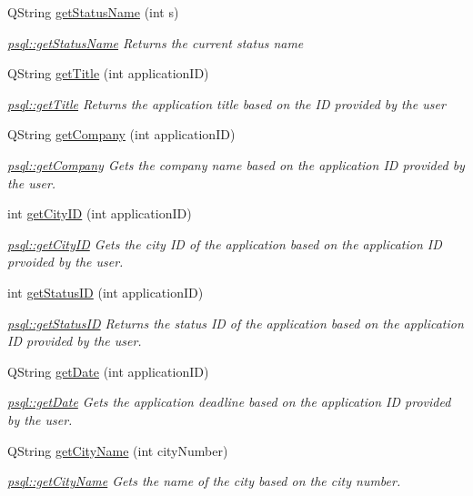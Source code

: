 \begin{DoxyCompactItemize}
Q\+String \hyperlink{classpsql_a5c2a64419a68a258071fd1f9a37c7c09}{get\+Status\+Name} (int s)
\begin{DoxyCompactList}\small\item\em \hyperlink{classpsql_a5c2a64419a68a258071fd1f9a37c7c09}{psql\+::get\+Status\+Name} Returns the current status name \end{DoxyCompactList}\item 
Q\+String \hyperlink{classpsql_ada9e3be3e0866011edf53e30ec510afc}{get\+Title} (int application\+ID)
\begin{DoxyCompactList}\small\item\em \hyperlink{classpsql_ada9e3be3e0866011edf53e30ec510afc}{psql\+::get\+Title} Returns the application title based on the ID provided by the user \end{DoxyCompactList}\item 
Q\+String \hyperlink{classpsql_a09745cd03f09ffb2dacacaab4281915f}{get\+Company} (int application\+ID)
\begin{DoxyCompactList}\small\item\em \hyperlink{classpsql_a09745cd03f09ffb2dacacaab4281915f}{psql\+::get\+Company} Gets the company name based on the application ID provided by the user. \end{DoxyCompactList}\item 
int \hyperlink{classpsql_af3462a12dc106e0ca8df4fa8fcf28436}{get\+City\+ID} (int application\+ID)
\begin{DoxyCompactList}\small\item\em \hyperlink{classpsql_af3462a12dc106e0ca8df4fa8fcf28436}{psql\+::get\+City\+ID} Gets the city ID of the application based on the application ID prvoided by the user. \end{DoxyCompactList}\item 
int \hyperlink{classpsql_a9c02c92c09cb60c35d24375673b7df06}{get\+Status\+ID} (int application\+ID)
\begin{DoxyCompactList}\small\item\em \hyperlink{classpsql_a9c02c92c09cb60c35d24375673b7df06}{psql\+::get\+Status\+ID} Returns the status ID of the application based on the application ID provided by the user. \end{DoxyCompactList}\item 
Q\+String \hyperlink{classpsql_a561f96bfe7e9d092077712dd6b186af8}{get\+Date} (int application\+ID)
\begin{DoxyCompactList}\small\item\em \hyperlink{classpsql_a561f96bfe7e9d092077712dd6b186af8}{psql\+::get\+Date} Gets the application deadline based on the application ID provided by the user. \end{DoxyCompactList}\item 
Q\+String \hyperlink{classpsql_a7acc18034ef60c8a1e69b0e1a15d8ab2}{get\+City\+Name} (int city\+Number)
\begin{DoxyCompactList}\small\item\em \hyperlink{classpsql_a7acc18034ef60c8a1e69b0e1a15d8ab2}{psql\+::get\+City\+Name} Gets the name of the city based on the city number. \end{DoxyCompactList}\end{DoxyCompactItemize}


